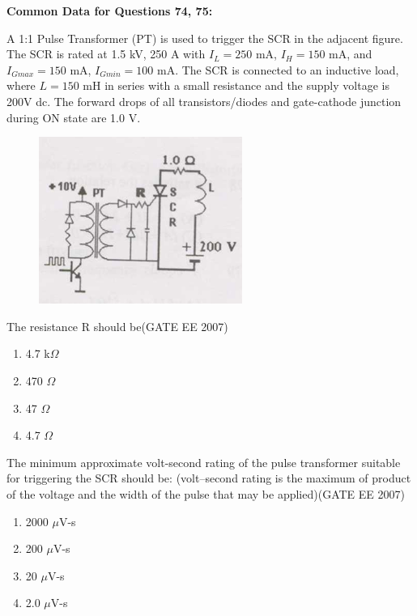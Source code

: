 \documentclass[a4paper,10pt]{exam}
\theoremstyle{remark}
\begin{document}
\begin{enumerate}
\vspace{1em}

\noindent\textbf{Common Data for Questions 74, 75:}

A 1:1 Pulse Transformer (PT) is used to trigger the SCR in the adjacent figure. The SCR is rated at 1.5 kV, 250 A with $I_L = 250$ mA, $I_H = 150$ mA, and $I_{Gmax} = 150$ mA, $I_{Gmin} = 100$ mA. The SCR is connected to an inductive load, where $L = 150$ mH in series with a small resistance and the supply voltage is 200V dc. The forward drops of all transistors/diodes and gate-cathode junction during ON state are 1.0 V.


\begin{figure}[H]
    \centering
    \includegraphics[width=0.4\linewidth]{figs/Q 74,75,76.png}
\end{figure}

\begin{minipage}{0.6\textwidth}
\item  The resistance R should be\hfill{(GATE EE 2007)}
\begin{multicols}{4}
\begin{enumerate}
    \item  4.7 k$\Omega$ 
 \item  470 $\Omega$
 \item  47 $\Omega$ 
 \item  4.7 $\Omega$ 
\end{enumerate}
\end{multicols}

\item  The minimum approximate volt-second rating of the pulse transformer suitable for triggering the SCR should be: (volt–second rating is the maximum of product of the voltage and the width of the pulse that may be applied)\hfill{(GATE EE 2007)}
\begin{multicols}{4}
\begin{enumerate}
   \item  2000 $\mu$V-s
 \item  200 $\mu$V-s
 \item  20 $\mu$V-s 
 \item  2.0 $\mu$V-s 
\end{enumerate}
\end{multicols}
\end{minipage}
\hfill


\end{enumerate}
\end{document}
